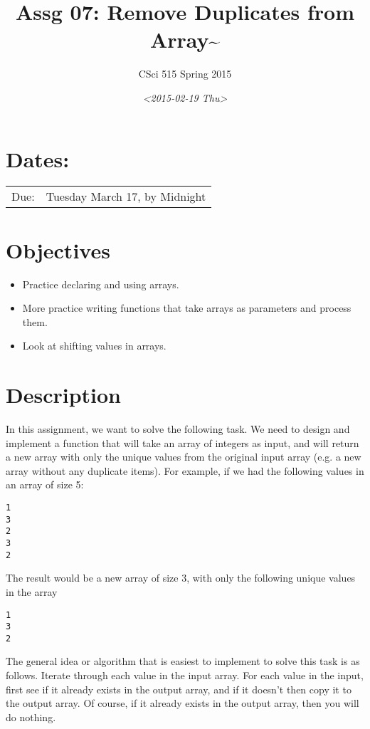 \documentclass[11pt]{article}
\author{CSci 515 Spring 2015}
\date{\textit{<2015-02-19 Thu>}}
\title{Assg 07: Remove Duplicates from Array\textasciitilde{}}
\begin{document}
\maketitle

\section*{Dates:}
\label{sec-1}
\begin{center}
\begin{tabular}{ll}
Due: & Tuesday March 17, by Midnight\\
\end{tabular}
\end{center}
\section*{Objectives}
\label{sec-2}
\begin{itemize}
\item Practice declaring and using arrays.
\item More practice writing functions that take arrays as parameters and
process them.
\item Look at shifting values in arrays.
\end{itemize}
\section*{Description}
\label{sec-3}
In this assignment, we want to solve the following task.  We need to design
and implement a function that will take an array of integers as input, and
will return a new array with only the unique values from the original
input array (e.g. a new array without any duplicate items).  For example,
if we had the following values in an array of size 5:

\begin{verbatim}
1
3
2
3
2
\end{verbatim}

The result would be a new array of size 3, with only the following unique
values in the array

\begin{verbatim}
1
3
2
\end{verbatim}

The general idea or algorithm that is easiest to implement to solve
this task is as follows.  Iterate through each value in the input
array.  For each value in the input, first see if it already exists in
the output array, and if it doesn't then copy it to the output array.
Of course, if it already exists in the output array, then you will do
nothing.
\end{document}
